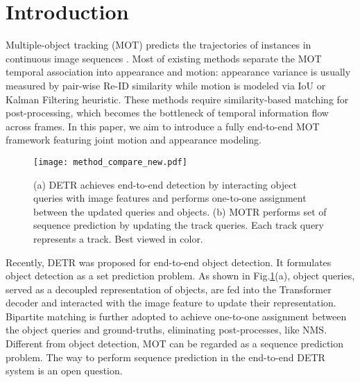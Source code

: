 \documentclass[runningheads]{llncs}
\begin{document}
\section{Introduction}
Multiple-object tracking (MOT) predicts the trajectories of instances in continuous image sequences \cite{wojke2017simple,bergmann2019twb}.
Most of existing methods separate the MOT temporal association into appearance and motion:
appearance variance is usually measured by pair-wise Re-ID similarity \cite{wang2019jde,zhang2020fairmot} while motion is modeled via IoU \cite{bochinski2017ioutracker} or Kalman Filtering \cite{bewley2016simple} heuristic.
These methods require similarity-based matching for post-processing, which becomes the bottleneck of temporal information flow across frames.
In this paper, we aim to introduce a fully end-to-end MOT framework featuring joint motion and appearance modeling.

\begin{figure}[t]
  \centering
  \texttt{[image: method\_compare\_new.pdf]}
  \caption{(a) DETR achieves end-to-end detection by interacting object queries with image features and performs one-to-one assignment between the updated queries and objects. (b) MOTR performs set of sequence prediction by updating the track queries. Each track query represents a track. Best viewed in color.}
  \label{method_compare_intro}
\end{figure}

Recently, DETR \cite{carion2020detr,zhu2020deformdetr} was proposed for end-to-end object detection. It formulates object detection as a set prediction problem. As shown in Fig.\;\ref{method_compare_intro}(a), object queries, served as a decoupled representation of objects, are fed into the Transformer decoder and interacted with the image feature to update their representation. Bipartite matching is further adopted to achieve one-to-one assignment between the object queries and ground-truths, eliminating post-processes, like NMS. Different from object detection, MOT can be regarded as a sequence prediction problem. The way to perform sequence prediction in the end-to-end DETR system is an open question.
\end{document}

